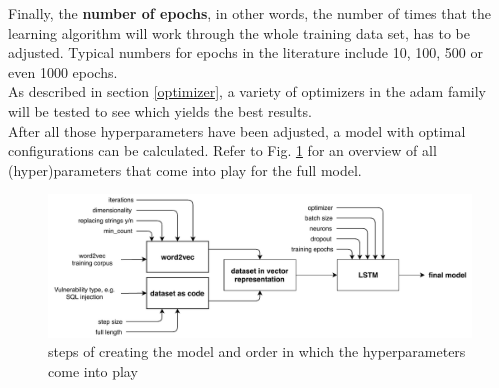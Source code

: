 \documentclass[
a4paper,
pagesize,
pdftex,
12pt,
twoside, %
BCOR=5mm, %
ngerman,
fleqn,
final,
]{scrartcl}
\begin{document}
	Finally, the \textbf{number of epochs}, in other words, the number of times that the learning algorithm will work through the whole training data set, has to be adjusted. Typical numbers for epochs in the literature include 10, 100, 500 or even 1000 epochs.\\
	As described in section \ref{optimizer}, a variety of optimizers in the adam family will be tested to see which yields the best results.\\
	After all those hyperparameters have been adjusted, a model with optimal configurations can be calculated. Refer to Fig. \ref{fig:parameters} for an overview of all (hyper)parameters that come into play for the full model.
	
	\begin{figure}[h]
		\centering
		\includegraphics[width=\linewidth]{img/Parameters}
		\caption{steps of creating the model and order in which the hyperparameters come into play}
		\label{fig:parameters}
	\end{figure}
	
\end{document}
